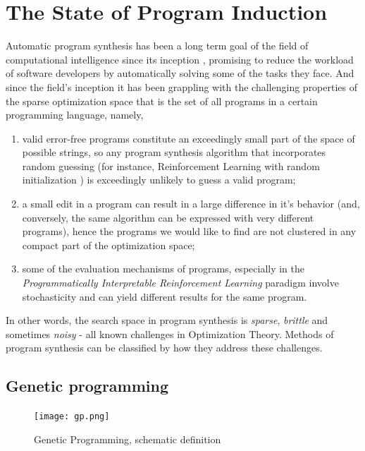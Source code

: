 \chapter{The State of Program Induction}
\label{ch:methods}

Automatic program synthesis has been a long term goal of the field of computational intelligence since its inception \cite{mannaAutomaticProgramSynthesis1971}, promising to reduce the workload of software developers by automatically solving some of the tasks they face.
And since the field's inception it has been grappling with the challenging properties of the sparse optimization space \cite{alurSyntaxguidedSynthesis2013, davidProgramSynthesisChallenges2017} that is the set of all programs in a certain programming language, namely, 
\begin{enumerate}
    \item valid error-free programs constitute an exceedingly small part of the space of possible strings, so any program synthesis algorithm that incorporates random guessing (for instance, Reinforcement Learning with random initialization \cite{suttonReinforcementLearningSecond2018}) is exceedingly unlikely to guess a valid program;
    \item a small edit in a program can result in a large difference in it's behavior (and, conversely, the same algorithm can be expressed with very different programs), hence the programs we would like to find are not clustered in any compact part of the optimization space;
    \item some of the evaluation mechanisms of programs, especially in the \emph{Programmatically Interpretable Reinforcement Learning} paradigm involve stochasticity and can yield different results for the same program.
\end{enumerate}

In other words, the search space in program synthesis is \emph{sparse}, \emph{brittle} and sometimes \emph{noisy} \cite{arnoldNoisyOptimizationEvolution2002} - all known challenges in Optimization Theory.
Methods of program synthesis can be classified by how they address these challenges.

\newpage
\section{Genetic programming}
\label{sec:gp}

\begin{figure}[H]
    \centering
    \texttt{[image: gp.png]}
    \caption{Genetic Programming, schematic definition}
    \label{fig:gp}
\end{figure}

